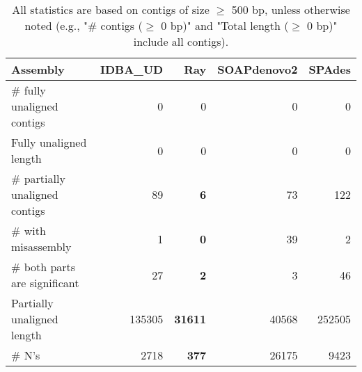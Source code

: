 \documentclass[12pt,a4paper]{article}
\begin{document}
\begin{table}[ht]
\begin{center}
\caption{All statistics are based on contigs of size $\geq$ 500 bp, unless otherwise noted (e.g., "\# contigs ($\geq$ 0 bp)" and "Total length ($\geq$ 0 bp)" include all contigs).}
\begin{tabular}{|l*{4}{|r}|}
\hline
Assembly & IDBA\_UD & Ray & SOAPdenovo2 & SPAdes \\ \hline
\# fully unaligned contigs & 0 & 0 & 0 & 0 \\ \hline
Fully unaligned length & 0 & 0 & 0 & 0 \\ \hline
\# partially unaligned contigs & 89 & {\bf 6} & 73 & 122 \\ \hline
\hspace{5mm}\# with misassembly & 1 & {\bf 0} & 39 & 2 \\ \hline
\hspace{5mm}\# both parts are significant & 27 & {\bf 2} & 3 & 46 \\ \hline
Partially unaligned length & 135305 & {\bf 31611} & 40568 & 252505 \\ \hline
\# N's & 2718 & {\bf 377} & 26175 & 9423 \\ \hline
\end{tabular}
\end{center}
\end{table}
\end{document}
